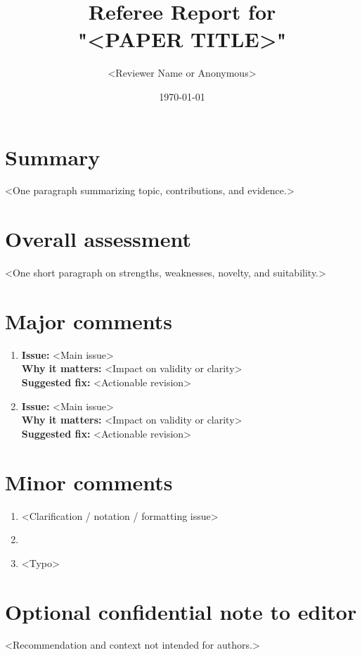 \documentclass[12pt]{article}
\title{Referee Report for\\"<PAPER TITLE>"}
\author{<Reviewer Name or Anonymous>}
\date{\today}
\begin{document}
\maketitle

\section*{Summary}
<One paragraph summarizing topic, contributions, and evidence.>

\section*{Overall assessment}
<One short paragraph on strengths, weaknesses, novelty, and suitability.>

\section*{Major comments}
\begin{enumerate}[leftmargin=*]
  \item \textbf{Issue:} <Main issue>\\
  \textbf{Why it matters:} <Impact on validity or clarity>\\
  \textbf{Suggested fix:} <Actionable revision>

  \item \textbf{Issue:} <Main issue>\\
  \textbf{Why it matters:} <Impact on validity or clarity>\\
  \textbf{Suggested fix:} <Actionable revision>
\end{enumerate}

\section*{Minor comments}
\begin{enumerate}[leftmargin=*]
  \item <Clarification / notation / formatting issue>
  \item <Citation or language cleanup>
  \item <Typo>
\end{enumerate}

\section*{Optional confidential note to editor}
<Recommendation and context not intended for authors.>
\end{document}
